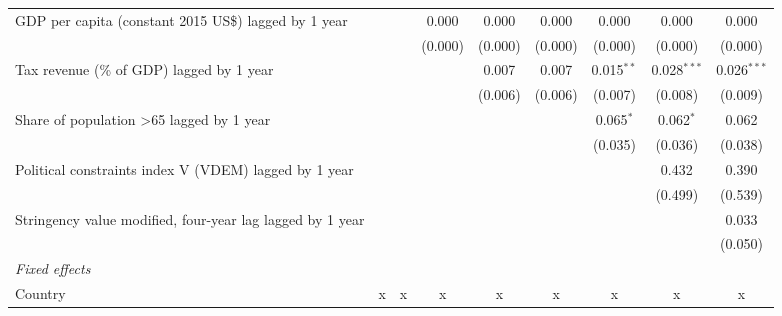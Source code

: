 \begin{tabular}{lcccccccc}
   GDP per capita (constant 2015 US\$) lagged by 1 year                               &               &               & 0.000         & 0.000         & 0.000         & 0.000         & 0.000         & 0.000\\   
                                                                                      &               &               & (0.000)       & (0.000)       & (0.000)       & (0.000)       & (0.000)       & (0.000)\\   
   Tax revenue (\% of GDP) lagged by 1 year                                           &               &               &               & 0.007         & 0.007         & 0.015$^{**}$  & 0.028$^{***}$ & 0.026$^{***}$\\   
                                                                                      &               &               &               & (0.006)       & (0.006)       & (0.007)       & (0.008)       & (0.009)\\   
   Share of population >65 lagged by 1 year                                           &               &               &               &               &               & 0.065$^{*}$   & 0.062$^{*}$   & 0.062\\   
                                                                                      &               &               &               &               &               & (0.035)       & (0.036)       & (0.038)\\   
   Political constraints index V (VDEM) lagged by 1 year                              &               &               &               &               &               &               & 0.432         & 0.390\\   
                                                                                      &               &               &               &               &               &               & (0.499)       & (0.539)\\   
   Stringency value modified, four-year lag lagged by 1 year                          &               &               &               &               &               &               &               & 0.033\\   
                                                                                      &               &               &               &               &               &               &               & (0.050)\\   
   \emph{Fixed effects}\\
   Country                                                                            & x             & x             & x             & x             & x             & x             & x             & x\\  

\end{tabular}
